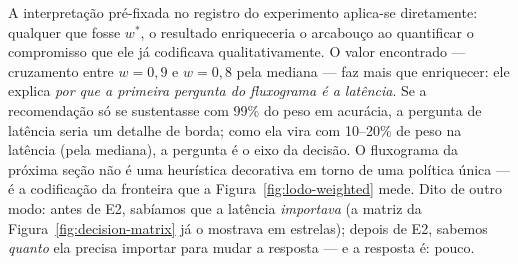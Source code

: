 A interpretação pré-fixada no registro do experimento aplica-se
diretamente: qualquer que fosse $w^{*}$, o resultado enriqueceria o
arcabouço ao quantificar o compromisso que ele já codificava
qualitativamente. O valor encontrado --- cruzamento entre $w{=}0{,}9$ e
$w{=}0{,}8$ pela mediana --- faz mais que enriquecer: ele explica
\emph{por que a primeira pergunta do fluxograma é a latência}. Se a
recomendação só se sustentasse com 99\% do peso em acurácia, a pergunta
de latência seria um detalhe de borda; como ela vira com 10--20\% de
peso na latência (pela mediana), a pergunta é o eixo da decisão. O fluxograma da
próxima seção não é uma heurística decorativa em torno de uma política
única --- é a codificação da fronteira que a
Figura~\ref{fig:lodo-weighted} mede. Dito de outro modo: antes de E2,
sabíamos que a latência \emph{importava} (a matriz da
Figura~\ref{fig:decision-matrix} já o mostrava em estrelas); depois de
E2, sabemos \emph{quanto} ela precisa importar para mudar a resposta ---
e a resposta é: pouco.

